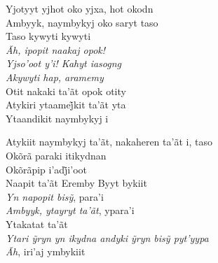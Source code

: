 \noindent   Yjotyyt yjhot oko yjxa, hot okodn\\
  Ambyyk, naymbykyj oko saryt taso\\
  Taso kywyti kywyti\\
  \textit{Ãh, ipopit naakaj opok!}\\
  \textit{Yjso'oot y'i! Kahyt iasogng}\\
  \textit{Akywyti hap, aramemy}\\
  Otit nakaki ta'ãt opok otity\\
  Atykiri ytaamej̃kit ta’ãt yta\\
  Ytaandikit naymbykyj i

\smallskip
 \begin{center}\end{center}
 \smallskip

\noindent   Atykiit naymbykyj ta'ãt, nakaheren ta'ãt i, taso\\
  Okõrã paraki itikydnan\\
  Okõrãpip i’adj̃i’oot \\
  Naapit ta'ãt Eremby Byyt bykiit\\
  \textit{Yn napopit bisỹ}, para’i\\
  \textit{Ambyyk, ytayryt ta'ãt}, ypara'i\\
  Ytakatat ta'ãt\\
  \textit{Ytari ỹryn yn ikydna andyki ỹryn bisỹ pyt’yypa}\\
  \textit{Ãh}, iri'aj ymbykiit

